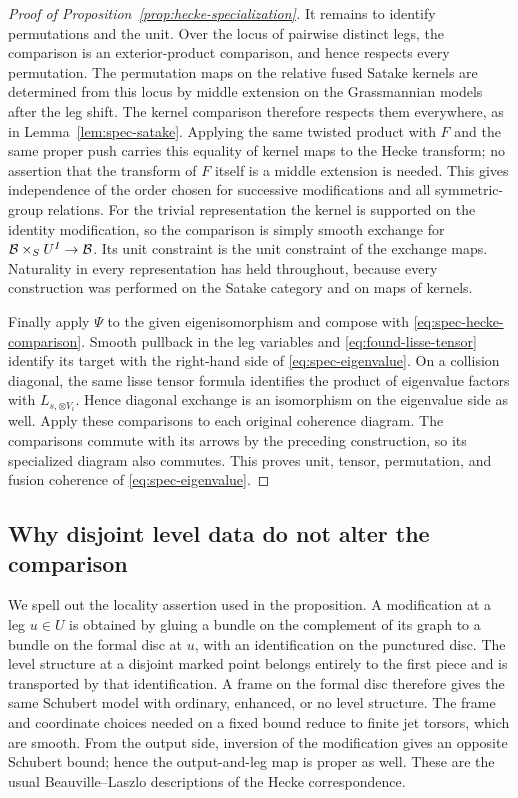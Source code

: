 \begin{proof}[Proof of Proposition~\ref{prop:hecke-specialization}]
It remains to identify permutations and the unit.  Over the locus of
pairwise distinct legs, the comparison is an exterior-product
comparison, and hence respects every permutation.  The permutation
maps on the relative fused Satake kernels are determined from this
locus by middle extension on the Grassmannian models after the leg shift.
The kernel comparison
therefore respects them everywhere, as in
Lemma~\ref{lem:spec-satake}.  Applying the same twisted product with
$F$ and the same proper push carries this equality of kernel maps to
the Hecke transform; no assertion that the transform of $F$ itself is
a middle extension is needed.  This gives independence of the order
chosen for successive modifications and all symmetric-group
relations.  For the trivial representation the kernel is supported on
the identity modification, so the comparison is simply smooth exchange
for $\mathcal B\times_S U^I\to\mathcal B$.  Its unit constraint is the unit
constraint of the exchange maps.  Naturality in every representation
has held throughout, because every construction was performed on the
Satake category and on maps of kernels.

Finally apply $\Psi$ to the given eigenisomorphism and compose with
\eqref{eq:spec-hecke-comparison}.  Smooth pullback in the leg variables
and \eqref{eq:found-lisse-tensor} identify its target with the
right-hand side of \eqref{eq:spec-eigenvalue}.  On a collision diagonal,
the same lisse tensor formula identifies the product of eigenvalue
factors with $L_{s,\otimes V_i}$.  Hence diagonal exchange is an
isomorphism on the eigenvalue side as well.  Apply these comparisons
to each original coherence diagram.  The comparisons commute with its
arrows by the preceding construction, so its specialized diagram also
commutes.  This proves unit, tensor, permutation, and fusion coherence
of \eqref{eq:spec-eigenvalue}.
\end{proof}

\subsection{Why disjoint level data do not alter the comparison}

We spell out the locality assertion used in the proposition.  A
modification at a leg $u\in U$ is obtained by gluing a bundle on the
complement of its graph to a bundle on the formal disc at $u$, with an
identification on the punctured disc.  The level structure at a disjoint
marked point belongs entirely to the first piece and is transported by
that identification.  A frame on the formal disc therefore gives the
same Schubert model with ordinary, enhanced, or no level structure.
The frame and coordinate choices needed on a fixed bound reduce to
finite jet torsors, which are smooth.  From the output side, inversion
of the modification gives an opposite Schubert bound; hence the
output-and-leg map is proper as well.  These are the usual
Beauville--Laszlo descriptions of the Hecke correspondence.

